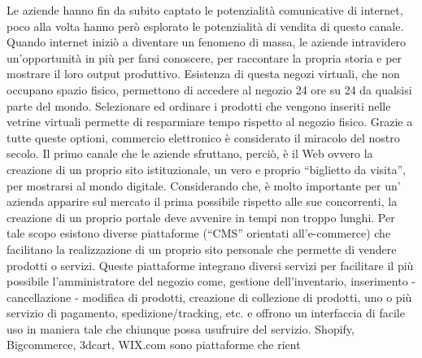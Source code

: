Le aziende hanno fin da subito captato le potenzialità comunicative di internet, poco alla volta hanno però esplorato le potenzialità di vendita di questo canale. Quando internet iniziò a diventare un fenomeno di massa, le aziende intravidero un’opportunità in più per farsi conoscere, per raccontare la propria storia e per mostrare il loro output produttivo.
Esistenza di questa negozi virtuali, che non occupano spazio fisico, permettono di accedere al negozio 24 ore su 24 da qualsisi parte del mondo. Selezionare ed ordinare i prodotti che vengono inseriti nelle vetrine virtuali permette di resparmiare tempo rispetto al negozio fisico. Grazie a tutte queste optioni, commercio elettronico è considerato il miracolo del nostro secolo.
\newline
Il primo canale che le aziende sfruttano, perciò, è il Web ovvero la creazione di un proprio sito istituzionale, un vero e proprio “biglietto da visita”, per mostrarsi al mondo digitale.
Considerando che, è molto importante per un' azienda apparire sul mercato il prima possibile rispetto alle sue concorrenti, la creazione di un proprio portale deve avvenire in tempi non troppo lunghi.
\newline
Per tale scopo esistono diverse piattaforme (“CMS” orientati all'e-commerce) che facilitano la realizzazione di un proprio sito personale che permette di vendere prodotti o servizi. Queste piattaforme integrano diversi servizi per facilitare il più possibile l'amministratore del negozio come, gestione dell'inventario, inserimento - cancellazione - modifica di prodotti, creazione di collezione di prodotti, uno o più servizio di pagamento, spedizione/tracking, etc. e offrono un interfaccia di facile uso in maniera tale che chiunque possa usufruire del servizio.
\newline
Shopify, Bigcommerce, 3dcart, WIX.com sono piattaforme che rient



